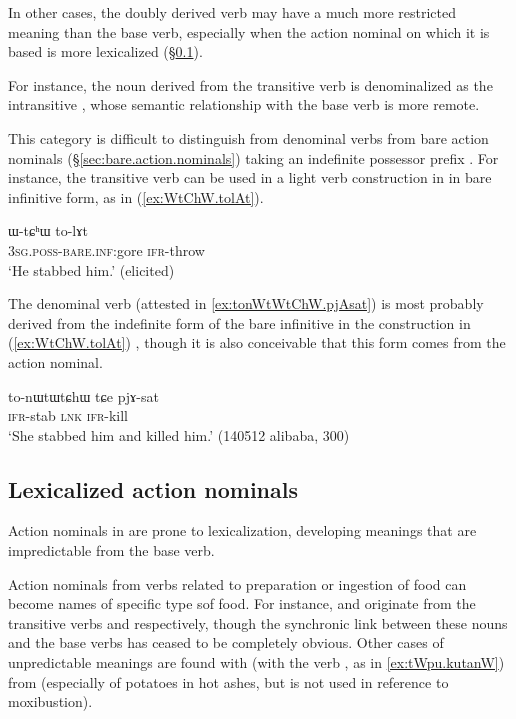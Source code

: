 In other cases, the doubly derived verb may have a much more restricted meaning than the base verb, especially when the action nominal on which it is based is more lexicalized (§\ref{sec:lexicalized.action.nominals}). 

For instance, the noun  derived from the transitive verb  is denominalized as the intransitive , whose semantic relationship with the base verb is more remote.

This category is difficult to distinguish from denominal verbs from bare action nominals (§\ref{sec:bare.action.nominals}) taking an indefinite possessor prefix . For instance, the transitive verb  can be used in a light verb construction in  in bare infinitive form, as in (\ref{ex:WtChW.tolAt}).

\begin{exe}
\ex \label{ex:WtChW.tolAt}
\gll  ɯ-tɕʰɯ to-lɤt \\
\textsc{3sg}.\textsc{poss}-\textsc{bare}.\textsc{inf}:gore \textsc{ifr}-throw \\
\glt `He stabbed him.' (elicited)
\end{exe}

The denominal verb  (attested in \ref{ex:tonWtWtChW.pjAsat}) is most probably derived from the indefinite form  of the bare infinitive in the construction in (\ref{ex:WtChW.tolAt}) , though it is also conceivable that this form comes from the action nominal.

\begin{exe}
\ex \label{ex:tonWtWtChW.pjAsat}
\gll  to-nɯtɯtɕhɯ tɕe pjɤ-sat \\
\textsc{ifr}-stab \textsc{lnk} \textsc{ifr}-kill \\
\glt `She stabbed him and killed him.' (140512 alibaba, 300)
\end{exe}

\subsection{Lexicalized action nominals}  \label{sec:lexicalized.action.nominals}
Action nominals in  are prone to lexicalization, developing meanings that are impredictable from the base verb.

Action nominals from verbs related to preparation or ingestion of food can become names of specific type sof food. For instance,  and  originate from the transitive verbs  and  respectively, though the synchronic link between these nouns and the base verbs has ceased to be completely obvious. Other cases of unpredictable meanings are found with  (with the verb , as in \ref{ex:tWpu.kutanW}) from  (especially of potatoes in hot ashes, but is not used in reference to moxibustion).

